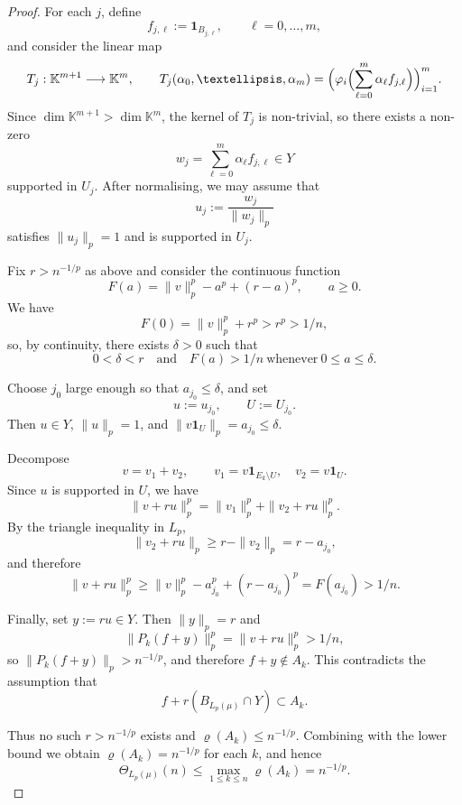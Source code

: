 \documentclass[10pt,a4paper]{amsart}
\newcommand{\K}{\mathbb{K}}
\renewcommand{\ge}{\geqslant}
\renewcommand{\le}{\leqslant}
\begin{document}
\begin{proof}
For each $j$, define
\[
f_{j,\ell}:=\mathbf 1_{B_{j,\ell}},\qquad \ell=0,\dots,m,
\]
and consider the linear map
\[
T_j:\K^{m+1}\longrightarrow\K^m,\qquad
T_j(\alpha_0,\dots,\alpha_m)
=
\Bigl(\varphi_i\Bigl(\sum_{\ell=0}^m \alpha_\ell f_{j,\ell}\Bigr)\Bigr)_{i=1}^m.
\]
Since $\dim \K^{m+1}>\dim \K^m$, the kernel of $T_j$ is non-trivial, so
there exists a non-zero
\[
w_j=\sum_{\ell=0}^m \alpha_\ell f_{j,\ell}\in Y
\]
supported in $U_j$. After normalising, we may assume that
\[
u_j:=\frac{w_j}{\|w_j\|_p}
\]
satisfies $\|u_j\|_p=1$ and is supported in $U_j$.

Fix $r>n^{-1/p}$ as above and consider the continuous function
\[
F(a)
=
\|v\|_p^p - a^p + (r-a)^p,\qquad a\ge0.
\]
We have
\[
F(0)=\|v\|_p^p+r^p>r^p>1/n,
\]
so, by continuity, there exists $\delta>0$ such that
\[
0<\delta<r
\quad\text{and}\quad
F(a)>1/n \ \text{whenever}\ 0\le a\le\delta.
\]

Choose $j_0$ large enough so that $a_{j_0}\le\delta$, and set
\[
u:=u_{j_0},\qquad U:=U_{j_0}.
\]
Then $u\in Y$, $\|u\|_p=1$, and $\|v\mathbf 1_U\|_p=a_{j_0}\le\delta$.

Decompose
\[
v=v_1+v_2,
\qquad
v_1=v\mathbf 1_{E_k\setminus U},\quad
v_2=v\mathbf 1_U.
\]
Since $u$ is supported in $U$, we have
\[
\|v+ru\|_p^p
=
\|v_1\|_p^p+\|v_2+ru\|_p^p.
\]
By the triangle inequality in $L_p$,
\[
\|v_2+ru\|_p
\ge r-\|v_2\|_p
= r-a_{j_0},
\]
and therefore
\[
\|v+ru\|_p^p
\ge
\|v\|_p^p-a_{j_0}^p+(r-a_{j_0})^p
=
F(a_{j_0})
>
1/n.
\]

Finally, set $y:=ru\in Y$. Then $\|y\|_p=r$ and
\[
\|P_k(f+y)\|_p^p
=
\|v+ru\|_p^p
>
1/n,
\]
so $\|P_k(f+y)\|_p>n^{-1/p}$, and therefore $f+y\notin A_k$. This
contradicts the assumption that
\[
f+r(B_{L_p(\mu)}\cap Y)\subset A_k.
\]

Thus no such $r>n^{-1/p}$ exists and $\varrho(A_k)\le n^{-1/p}$. Combining
with the lower bound we obtain $\varrho(A_k)=n^{-1/p}$ for each $k$, and
hence
\[
\Theta_{L_p(\mu)}(n)
\le \max_{1\le k\le n}\varrho(A_k)
= n^{-1/p}.
\]
\end{proof}
\end{document}
